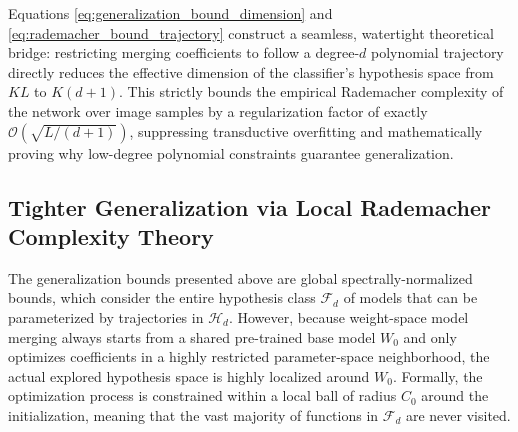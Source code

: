 Equations \ref{eq:generalization_bound_dimension} and \ref{eq:rademacher_bound_trajectory} construct a seamless, watertight theoretical bridge: restricting merging coefficients to follow a degree-$d$ polynomial trajectory directly reduces the effective dimension of the classifier's hypothesis space from $K L$ to $K(d+1)$. This strictly bounds the empirical Rademacher complexity of the network over image samples by a regularization factor of exactly $\mathcal{O}(\sqrt{L / (d+1)})$, suppressing transductive overfitting and mathematically proving why low-degree polynomial constraints guarantee generalization.

\subsection{Tighter Generalization via Local Rademacher Complexity Theory}
\label{subsec:local_rademacher_theory}
The generalization bounds presented above are global spectrally-normalized bounds, which consider the entire hypothesis class $\mathcal{F}_d$ of models that can be parameterized by trajectories in $\mathcal{H}_d$. However, because weight-space model merging always starts from a shared pre-trained base model $W_0$ and only optimizes coefficients in a highly restricted parameter-space neighborhood, the actual explored hypothesis space is highly localized around $W_0$. Formally, the optimization process is constrained within a local ball of radius $C_0$ around the initialization, meaning that the vast majority of functions in $\mathcal{F}_d$ are never visited. 

